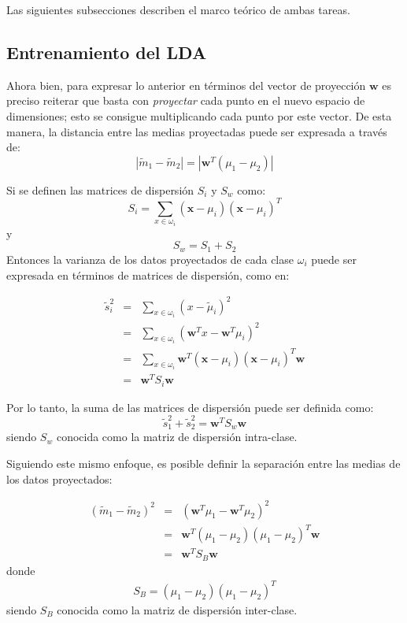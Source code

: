 \documentclass[journal]{IEEEtran}
\begin{document}
Las siguientes subsecciones describen el marco teórico de ambas tareas.

\subsection{Entrenamiento del LDA} %
\label{sub:entrenamiento_del_lda}

Ahora bien, para expresar lo anterior en términos del vector de proyección $\mathbf{w}$ es preciso reiterar que basta con \emph{proyectar} cada punto en el nuevo espacio de dimensiones; esto se consigue multiplicando cada punto por este vector.
De esta manera, la distancia entre las medias proyectadas puede ser expresada a través de:
\begin{equation}
|\tilde{m}_1 - \tilde{m}_2| = |\mathbf{w}^T (\mu_1 - \mu_2)|
\end{equation}

Si se definen las matrices de dispersión $S_i$ y $S_w$ como:
\begin{equation}
S_i = \sum_{x\in\omega_i}(\mathbf{x}-\mu_i)(\mathbf{x} - \mu_i)^T
\end{equation}
y
\begin{equation}
S_w = S_1 + S_2
\end{equation}
Entonces la varianza de los datos proyectados de cada clase $\omega_i$ puede ser expresada en términos de matrices de dispersión, como en:

\begin{eqnarray}
\tilde{s}_i^2 &=& \sum_{x\in\omega_i}{(x-\tilde{\mu}_i)^2} \label{eq:varianzas} \\ 
&=& \sum_{x\in\omega_i}{(\mathbf{w}^Tx-\mathbf{w}^T\mu_i)^2} \\
&=& \sum_{x\in\omega_i}{\mathbf{w}^T(\mathbf{x}-\mu_i)(\mathbf{x} - \mu_i)^T\mathbf{w}} \\
&=& \mathbf{w}^TS_i\mathbf{w}
\end{eqnarray}

Por lo tanto, la suma de las matrices de dispersión puede ser definida como:
\begin{equation}
\tilde{s}_1^2 + \tilde{s}_2^2 = \mathbf{w}^TS_w\mathbf{w}
\end{equation}
siendo $S_w$ conocida como la matriz de dispersión intra-clase.

Siguiendo este mismo enfoque, es posible definir la separación entre las medias de los datos proyectados:

\begin{eqnarray}
(\tilde{m}_1 - \tilde{m}_2)^2 &=&  (\mathbf{w}^T\mu_1 - \mathbf{w}^T\mu_2)^2 \label{eq:medias} \\ 
&=& \mathbf{w}^T(\mu_1 - \mu_2)(\mu_1 - \mu_2)^T\mathbf{w} \\
&=& \mathbf{w}^TS_B\mathbf{w}
\end{eqnarray}
donde 
\begin{eqnarray}
S_B = (\mu_1 - \mu_2)(\mu_1 - \mu_2)^T
\end{eqnarray}
siendo $S_B$ conocida como la matriz de dispersión inter-clase.
\end{document}
